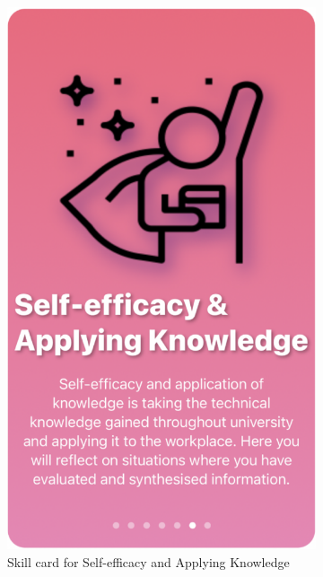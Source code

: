 \documentclass{l4proj}
\begin{document}
\begin{appendices}
\begin{figure}[H]
\begin{subfigure}[b]{0.3\textwidth}
        \includegraphics[scale=0.25]{images/SE-AKCard.pdf}
        \caption{Skill card for Self-efficacy and Applying Knowledge}
        \label{fig:SE-AKCard}
    \end{subfigure}
    \begin{subfigure}[b]{0.3\textwidth}

\end{subfigure}
\end{figure}
\end{appendices}
\end{document}
